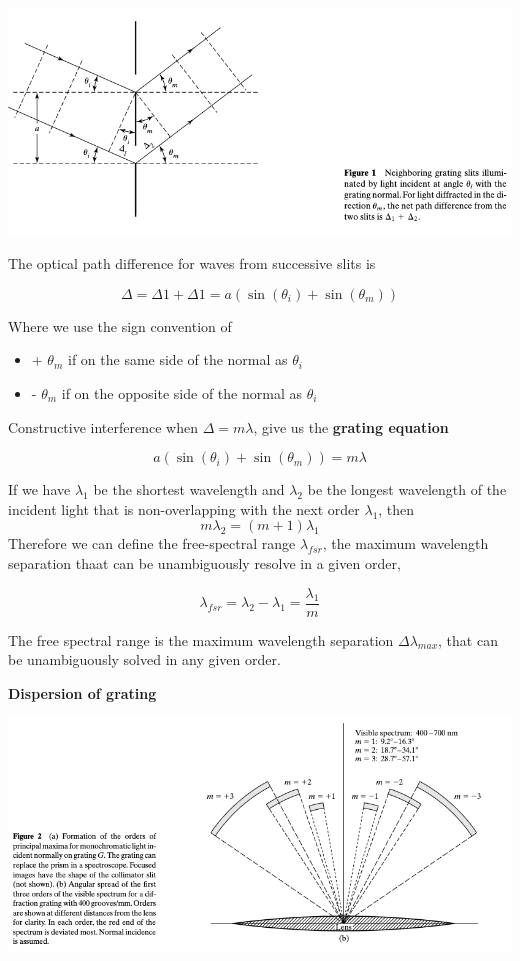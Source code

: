 \documentclass[10pt]{article}
\begin{document}
\begin{center}
    \includegraphics[scale = .7]{imgs/diffratction-fig-1.png}
\end{center}

The optical path difference for waves from successive slits is 

\[\Delta = \Delta 1 + \Delta 1 = a(\sin(\theta_i) + \sin(\theta_m))\]

Where we use the sign convention of 
\begin{itemize}
    \item + $\theta_m$ if on the same side of the normal as $\theta_i$
    \item - $\theta_m$ if on the opposite side of the normal as $\theta_i$
\end{itemize}

Constructive interference when $\Delta = m \lambda$, give us the \textbf{grating equation}

\[a(\sin(\theta_i) + \sin(\theta_m)) = m \lambda\]

If we have $\lambda_1$ be the shortest wavelength and $\lambda_2$ be the longest wavelength of the incident light that is non-overlapping with the next order $\lambda_1$, then 
\[m\lambda_2 = (m+1)\lambda_1\]
Therefore we can define the free-spectral range $\lambda_{fsr}$, the maximum wavelength separation thaat can be unambiguously resolve in a given order, 

\[\lambda_{fsr} = \lambda_2 - \lambda_1 = \frac{\lambda_1}{m}\]

The free spectral range is the maximum wavelength separation $\Delta \lambda_{max}$, that can be unambiguously solved in any given order.

\textbf{Dispersion of grating}

\begin{center}
    \includegraphics[scale = .6]{imgs/fsr-grating.png}
\end{center}
\end{document}

